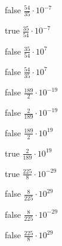 \begin{reponses}
    \item[false] $\frac{54}{35}\cdot 10^{-7}$
    \item[true] $\frac{35}{54}\cdot 10^{-7}$
    \item[false] $\frac{35}{54}\cdot 10^{7}$
    \item[false] $\frac{54}{35}\cdot 10^{7}$
\end{reponses}

\begin{question}{1211}{Calcul}{0{{/}
    Que vaut $\frac{2\cdot 10^{7}\times 2\cdot 10^{9}}{2\cdot 10^{0}\times 7\cdot 10^{-4}\times 3\cdot 10^{1}\times 9\cdot 10^{0}}$?
\end{question}

\begin{reponses}
    \item[false] $\frac{189}{2}\cdot 10^{-19}$
    \item[false] $\frac{2}{189}\cdot 10^{-19}$
    \item[false] $\frac{189}{2}\cdot 10^{19}$
    \item[true] $\frac{2}{189}\cdot 10^{19}$
\end{reponses}

\begin{question}{1211}{Calcul}{0{{/}
    Que vaut $\frac{5\cdot 10^{-6}\times 5\cdot 10^{-9}\times 9\cdot 10^{0}\times 3\cdot 10^{-1}\times 7\cdot 10^{-8}}{7\cdot 10^{2}\times 8\cdot 10^{-6}\times 3\cdot 10^{9}}$?
\end{question}

\begin{reponses}
    \item[true] $\frac{225}{8}\cdot 10^{-29}$
    \item[false] $\frac{8}{225}\cdot 10^{29}$
    \item[false] $\frac{8}{225}\cdot 10^{-29}$
    \item[false] $\frac{225}{8}\cdot 10^{29}$
\end{reponses}


